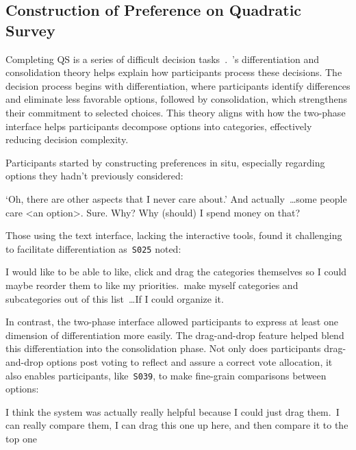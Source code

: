 \subsection{Construction of Preference on Quadratic Survey}

Completing QS is a series of difficult decision tasks~\textcite{lichtensteinConstructionPreference2006}.~\textcite{svensonDifferentiationConsolidationTheory1992}'s differentiation and consolidation theory helps explain how participants process these decisions. The decision process begins with differentiation, where participants identify differences and eliminate less favorable options, followed by consolidation, which strengthens their commitment to selected choices. This theory aligns with how the two-phase interface helps participants decompose options into categories, effectively reducing decision complexity.

Participants started by constructing preferences in situ, especially regarding options they hadn’t previously considered:
\begin{displayquote}
    \bracketellipsis`Oh, there are other aspects that I never care about.' And actually~\ldots some people care <an option>. Sure. Why? Why (should) I spend money on that? \\\hfill{}
\end{displayquote}

Those using the text interface, lacking the interactive tools, found it challenging to facilitate differentiation as~\texttt{S025} noted:

\begin{displayquote}
    I would like to be able to like, click and drag the categories themselves so I could maybe reorder them to like my priorities.~\bracketellipsis make myself categories and subcategories out of this list~\ldots If I could organize it. \hfill{}
\end{displayquote}

In contrast, the two-phase interface allowed participants to express at least one dimension of differentiation more easily. The drag-and-drop feature helped blend this differentiation into the consolidation phase. Not only does participants drag-and-drop options post voting to reflect and assure a correct vote allocation, it also enables participants, like~\texttt{S039}, to make fine-grain comparisons between options:

\begin{displayquote}
    I think the system was actually really helpful because I could just drag them.~\bracketellipsis I can really compare them, I can drag this one up here, and then compare it to the top one~\bracketellipsis \hfill{}
\end{displayquote}

